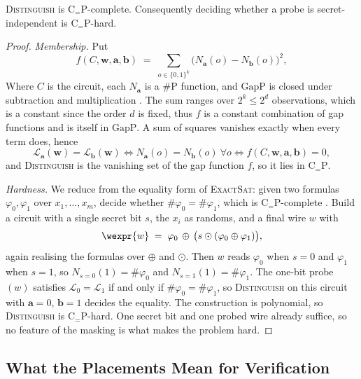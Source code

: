   \begin{theorem}
  \label{thm:distinguish-ceqp}
  \textsc{Distinguish} is $\mathrm{C}_{=}\mathrm{P}$-complete. Consequently deciding
  whether a probe is secret-independent is $\mathrm{C}_{=}\mathrm{P}$-hard.
  \end{theorem}

  \begin{proof}
  \emph{Membership.} Put
  \[
    f(C, \mathbf{w}, \mathbf{a}, \mathbf{b}) \;=\; \sum_{o \in \{0,1\}^{k}}
      \big(N_{\mathbf{a}}(o) - N_{\mathbf{b}}(o)\big)^2 ,
  \]
  Where $C$ is the circuit, each $N_{\mathbf{a}}$ is a $\#\mathrm{P}$ function,
  and $\mathrm{GapP}$ is closed under
  subtraction and multiplication \parencite{fenner1994gap}. The sum ranges over
  $2^{k} \le 2^{d}$ observations, which is a constant since the order $d$ is fixed, thus $f$ is
  a constant combination of gap functions and is itself in $\mathrm{GapP}$. A sum of
  squares vanishes exactly when every term does, hence
  \[
    \mathcal{L}_{\mathbf{a}}(\mathbf{w}) = \mathcal{L}_{\mathbf{b}}(\mathbf{w})
    \iff N_{\mathbf{a}}(o) = N_{\mathbf{b}}(o) \ \forall o
    \iff f(C, \mathbf{w}, \mathbf{a}, \mathbf{b}) = 0 ,
  \]
  and \textsc{Distinguish} is the vanishing set of the gap function $f$, so it lies in
  $\mathrm{C}_{=}\mathrm{P}$.

  \emph{Hardness.} We reduce from the equality form of \textsc{ExactSat}: given two
  formulas $\varphi_0, \varphi_1$ over $x_1, \dots, x_m$, decide whether
  $\#\varphi_0 = \#\varphi_1$, which is $\mathrm{C}_{=}\mathrm{P}$-complete
  \parencite{wagner1986complexity}. Build a circuit with a single secret bit $s$,
  the $x_i$ as randoms, and a final wire $w$ with
  \[
    \wexpr{w} \;=\; \varphi_0 \,\oplus\, \big(s \odot (\varphi_0 \oplus \varphi_1)\big) ,
  \]
  again realising the formulas over $\oplus$ and $\odot$. Then $w$ reads
  $\varphi_0$ when $s = 0$ and $\varphi_1$ when $s = 1$, so
  $N_{s=0}(1) = \#\varphi_0$ and $N_{s=1}(1) = \#\varphi_1$. The one-bit probe
  $(w)$ satisfies $\mathcal{L}_{0} = \mathcal{L}_{1}$ if and only if
  $\#\varphi_0 = \#\varphi_1$, so \textsc{Distinguish} on this circuit with
  $\mathbf{a} = 0$, $\mathbf{b} = 1$ decides the equality. The construction is
  polynomial, so \textsc{Distinguish} is $\mathrm{C}_{=}\mathrm{P}$-hard. One secret
  bit and one probed wire already suffice, so no feature of the masking is what
  makes the problem hard.
  \end{proof}

  \subsection{What the Placements Mean for Verification}
  \label{sec:hardness-consequences}

